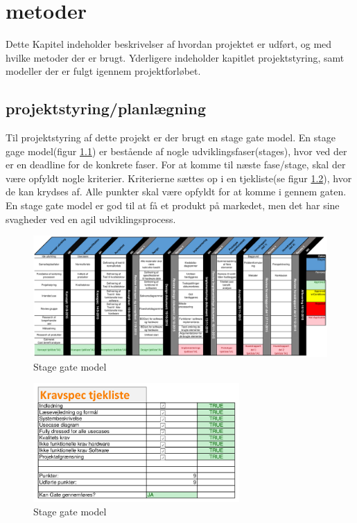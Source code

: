 \chapter{metoder}
Dette Kapitel indeholder beskrivelser af hvordan projektet er udført, og med hvilke metoder der er brugt. Yderligere indeholder kapitlet projektstyring, samt modeller der er fulgt igennem projektforløbet. 
\section{projektstyring/planlægning} 
Til projektstyring af dette projekt er der brugt en stage gate model. En stage gage model(figur \ref{fig:stage-gate}) er bestående af nogle udviklingsfaser(stages), hvor ved der er en deadline for de konkrete faser. For at komme til næste fase/stage, skal der være opfyldt nogle kriterier. Kriterierne sættes op i en tjekliste(se figur \ref{fig:stage-gate-tjekliste}), hvor de kan krydses af. Alle punkter skal være opfyldt for at komme i gennem gaten. En stage gate model er god til at få et produkt på markedet, men det har sine svagheder ved en agil udviklingsprocess. 
\begin{landscape}
\begin{figure}[H]
	\centering
	\includegraphics[width=1.6\textwidth]{billeder/Hovedrapport/Stage-gateP.PDF}
	\caption{Stage gate model}
	\label{fig:stage-gate}
\end{figure}
\end{landscape}

\begin{figure}[H]
	\centering
	\includegraphics[width=0.7\textwidth]{billeder/Hovedrapport/Stagegatetjekliste.PDF}
	\caption{Stage gate model}
	\label{fig:stage-gate-tjekliste}
\end{figure}

